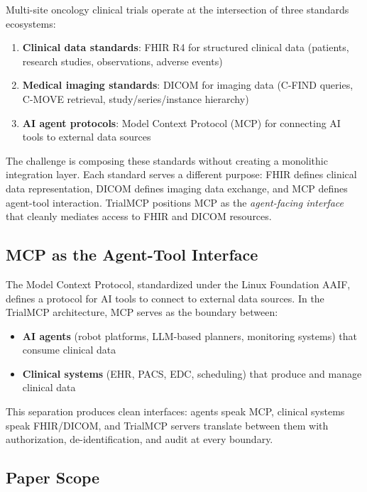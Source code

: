 \documentclass[10pt,letterpaper]{article}
\begin{document}
Multi-site oncology clinical trials operate at the intersection of three standards ecosystems:

\begin{enumerate}[leftmargin=2em]
    \item \textbf{Clinical data standards}: FHIR R4 \cite{fhir2019r4} for structured clinical data (patients, research studies, observations, adverse events)
    \item \textbf{Medical imaging standards}: DICOM \cite{dicom2024std} for imaging data (C-FIND queries, C-MOVE retrieval, study/series/instance hierarchy)
    \item \textbf{AI agent protocols}: Model Context Protocol (MCP) \cite{mcp2025spec} for connecting AI tools to external data sources
\end{enumerate}

The challenge is composing these standards without creating a monolithic integration layer. Each standard serves a different purpose: FHIR defines clinical data representation, DICOM defines imaging data exchange, and MCP defines agent-tool interaction. TrialMCP positions MCP as the \textit{agent-facing interface} that cleanly mediates access to FHIR and DICOM resources.

\subsection{MCP as the Agent-Tool Interface}

The Model Context Protocol, standardized under the Linux Foundation AAIF, defines a protocol for AI tools to connect to external data sources. In the TrialMCP architecture, MCP serves as the boundary between:

\begin{itemize}[leftmargin=2em]
    \item \textbf{AI agents} (robot platforms, LLM-based planners, monitoring systems) that consume clinical data
    \item \textbf{Clinical systems} (EHR, PACS, EDC, scheduling) that produce and manage clinical data
\end{itemize}

This separation produces clean interfaces: agents speak MCP, clinical systems speak FHIR/DICOM, and TrialMCP servers translate between them with authorization, de-identification, and audit at every boundary.

\subsection{Paper Scope}
\end{document}
